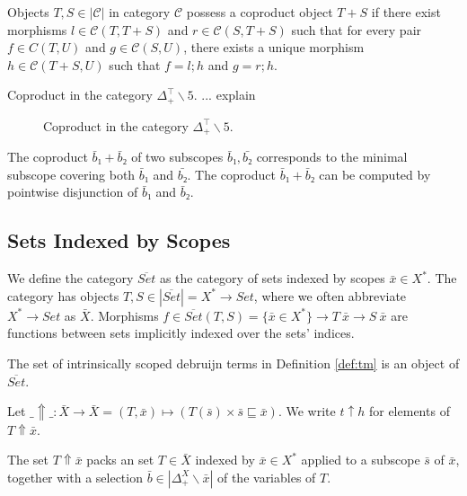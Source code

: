 \documentclass[runningheads]{llncs}
\begin{document}
\begin{definition}
  Objects $T, S ∈ |𝒞|$ in category $𝒞$ possess a coproduct object $T + S$ if there exist morphisms $l ∈ 𝒞(T, T + S)$ and $r ∈ 𝒞(S, T + S)$ such that for every pair $f ∈ C(T,U)$ and $g ∈ 𝒞(S,U)$, there exists a unique morphism $h ∈ 𝒞(T + S,U)$ such that $f = l;h$ and $g = r;h$.
\end{definition}
\begin{example}
  Coproduct in the category $Δ_+^⊤∖5$. ... explain
  \begin{figure}[h]
    \centering
    \caption{Coproduct in the category $Δ_+^⊤∖5$.}
    \label{fig:ex5}
  \end{figure}
\end{example}
\begin{remark}
  The coproduct $\bar{b}₁ + \bar{b}₂$ of two subscopes $\bar{b}₁, \bar{b₂}$ corresponds to the minimal subscope covering both $\bar{b}₁$ and $\bar{b₂}$. 
  The coproduct $\bar{b}₁ + \bar{b}₂$ can be computed by pointwise disjunction of $\bar{b}₁$ and $\bar{b}₂$. 
\end{remark}

\subsection{Sets Indexed by Scopes}

\begin{definition}
  We define the category $\overline{Set}$ as the category of sets indexed by scopes $\bar{x} ∈ X^*$. The category has objects $T, S ∈ |\overline{Set}| = X^* \to Set$, where we often abbreviate $X^* \to Set$ as $\bar{X}$. Morphisms $f ∈ \overline{Set}(T, S) = \{\bar{x} ∈ X^*\} \to T \ \bar{x} \to S \ \bar{x}$ are functions between sets implicitly indexed over the sets' indices.
\end{definition}
\begin{example}
  The set of intrinsically scoped debruijn terms in Definition \ref{def:tm} is an object of $\overline{Set}$.
\end{example}
\begin{definition}
  Let $\_⇑\_ : \bar{X} → \bar{X} = (T, \bar{x}) ↦ (T(\bar{s}) × \bar{s} ⊑ \bar{x})$. We write $t ↑ h$ for elements of  $T ⇑ \bar{x}$. 
\end{definition}
\begin{remark}
  The set $T⇑\bar{x}$ packs an set $T ∈ \bar{X}$ indexed by $\bar{x} ∈ X^*$ applied to a subscope $\bar{s}$ of $\bar{x}$, together with a selection $\bar{b} ∈ |Δ_+^X∖\bar{x}|$ of the variables of $T$.
\end{remark}
\end{document}
